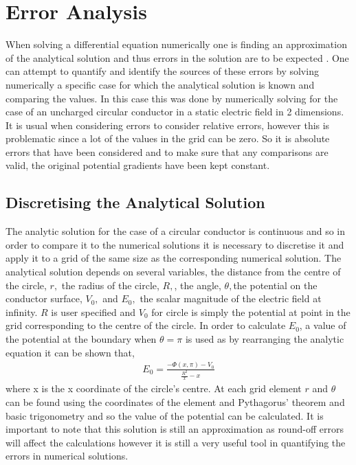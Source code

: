 \documentclass[aps,twocolumn,pre,nofootinbib,10pt]{revtex4-1}
\begin{document}
\section{Error Analysis \label{sec:unc}}

When solving a differential equation numerically one is finding an approximation of the analytical solution and thus errors in the solution are to be expected \cite{compmethods}.
One can attempt to quantify and identify the sources of these errors by solving numerically a specific case for which the analytical solution is known and comparing the values. In this case this was done by numerically solving for the case of an uncharged circular conductor in a static electric field in 2 dimensions. It is usual when considering errors to consider relative errors, however this is problematic since a lot of the values in the grid can be zero. So it is absolute errors that have been considered and to make sure that any comparisons are valid, the original potential gradients have been kept constant.

\subsection{Discretising the Analytical Solution}

The analytic solution for the case of a circular conductor is continuous and so in order to compare it to the numerical solutions it is necessary to discretise it and apply it to a grid of the same size as the corresponding numerical solution. The analytical solution depends on several variables, the distance from the centre of the circle, \(r,\) the radius of the circle, \(R,\), the angle, \(\theta,\)the potential on the conductor surface, \(V_0,\) and \(E_0,\) the scalar magnitude of the electric field at infinity. \(R\) is user specified and \(V_0\) for circle is simply the potential at point in the grid corresponding to the centre of the circle. In order to calculate \(E_0\), a value of the potential at the boundary when \(\theta = \pi\) is used as by rearranging the analytic equation it can be shown that,
\begin{gather*}
E_0 = \frac{-\Phi(x,\pi)-V_0}{\frac{R^2}{x} - x}
\end{gather*}
where x is the x coordinate of the circle's centre.
At each grid element \(r\) and \(\theta\) can be found using the coordinates of the element and Pythagorus' theorem and basic trigonometry and so the value of the potential can be calculated. It is important to note that this solution is still an approximation as round-off errors will affect the calculations however it is still a very useful tool in quantifying the errors in numerical solutions.
\end{document}
